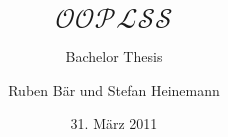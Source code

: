 \documentclass[t,xcolor=svgnames]{beamer}
\title[Object-Oriented Language with Subtyping and Subclassing]{$\mathcal{OOPLSS}$}
\subtitle{Bachelor Thesis}
\institute[BFH-TI]{\textbf{Bern University of Applied Sciences}\\
Engineering and Information Technology}
\author[Ruben Bär und Stefan Heinemann]{Ruben Bär und Stefan Heinemann}
\date{31. März 2011}
\begin{document}
  \mylstset
  
  
  
  
  
  
  
\end{document}

